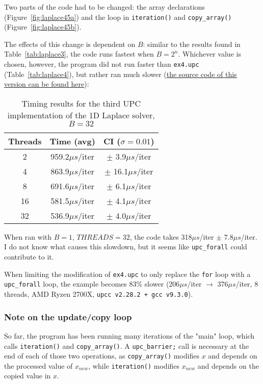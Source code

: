 \documentclass[12pt]{article}
\newcommand{\us}[0]{${\mu}s$}
\begin{document}
Two parts of the code had to be changed: the array declarations (Figure~\ref{fig:laplace45a}) and the loop in \texttt{iteration()} and \texttt{copy\_array()} (Figure~\ref{fig:laplace45b}).

The effects of this change is dependent on $B$: similar to the results found in Table~\ref{tab:laplace3}, the code runs fastest when $B = 2^n$.
Whichever value is chosen, however, the program did not run faster than \texttt{ex4.upc} (Table~\ref{tab:laplace4}), but rather ran much slower (\href{https://github.com/adri326/pc40-upc/tree/main/laplace/ex5.upc}{the source code of this version can be found here}):

\begin{table}[ht]
  \centering\begin{tabular}{|c|c|c|}
    \hline
    Threads & Time (avg) & CI ($\sigma=0.01$) \\
    \hline
    2 & 959.2\us/iter & $\pm$ 3.9\us/iter \\
    4 & 863.9\us/iter & $\pm$ 16.1\us/iter \\
    8 & 691.6\us/iter & $\pm$ 6.1\us/iter \\
    16 & 581.5\us/iter & $\pm$ 4.1\us/iter \\
    32 & 536.9\us/iter & $\pm$ 4.0\us/iter \\
    \hline
  \end{tabular}
  \caption{Timing results for the third UPC implementation of the 1D Laplace solver, $B = 32$}
  \label{tab:laplace5}
\end{table}

When ran with $B = 1$, $THREADS = 32$, the code takes 318\us/iter $\pm$ 7.8\us/iter.
I do not know what causes this slowdown, but it seems like \texttt{upc\_forall} could contribute to it.

When limiting the modification of \texttt{ex4.upc} to only replace the \texttt{for} loop with a \texttt{upc\_forall} loop, the example becomes $83\%$ slower (206\us/iter $\rightarrow$ 376\us/iter, 8 threads, AMD Ryzen 2700X, \texttt{upcc v2.28.2 + gcc v9.3.0}).

\subsubsection{Note on the update/copy loop}

So far, the program has been running many iterations of the "main" loop, which calls \texttt{iteration()} and \texttt{copy\_array()}.
A \texttt{upc\_barrier;} call is necessary at the end of each of those two operations, as \texttt{copy\_array()} modifies $x$ and depends on the processed value of $x_{new}$, while \texttt{iteration()} modifies $x_{new}$ and depends on the copied value in $x$.
\end{document}
